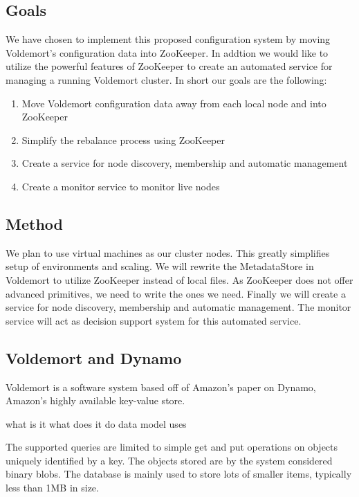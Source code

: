 \subsection{Goals}
We have chosen to implement this proposed configuration system by moving Voldemort's configuration data into ZooKeeper. In addtion we would like to utilize the powerful features of ZooKeeper to create an automated service for managing a running Voldemort cluster. In short our goals are the following:

\begin{enumerate}
	\item{Move Voldemort configuration data away from each local node and into ZooKeeper}
	\item{Simplify the rebalance process using ZooKeeper}
	\item{Create a service for node discovery, membership and automatic management}
	\item{Create a monitor service to monitor live nodes}
\end{enumerate}

\subsection{Method}
We plan to use virtual machines as our cluster nodes. This greatly simplifies setup of environments and scaling. We will rewrite the MetadataStore in Voldemort to utilize ZooKeeper instead of local files. As ZooKeeper does not offer advanced primitives, we need to write the ones we need. Finally we will create a service for node discovery, membership and automatic management. The monitor service will act as decision support system for this automated service. 

\subsection{Voldemort and Dynamo}
Voldemort is a software system based off of Amazon's paper on Dynamo, Amazon's highly available key-value store\cite{dynamo}. 

what is it
what does it do
data model
uses





The supported queries are limited to simple get and put operations on objects uniquely identified by a key. 
The objects stored are by the system considered binary blobs.
The database is mainly used to store lots of smaller items, typically less than 1MB in size.

